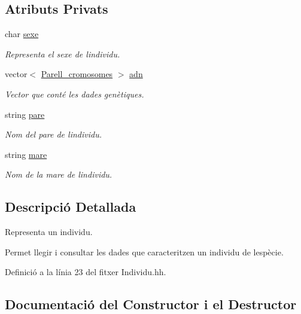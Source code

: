 \subsection*{Atributs Privats}
\begin{DoxyCompactItemize}
\item 
char \hyperlink{class_individu_a978281da58a84f7e4b8f3b9645cc6ec1}{sexe}
\begin{DoxyCompactList}\small\item\em Representa el sexe de l\textquotesingle{}individu. \end{DoxyCompactList}\item 
vector$<$ \hyperlink{class_parell__cromosomes}{Parell\+\_\+cromosomes} $>$ \hyperlink{class_individu_a9e3ff2f5573b349ddb98dff46b11e143}{adn}
\begin{DoxyCompactList}\small\item\em Vector que conté les dades genètiques. \end{DoxyCompactList}\item 
string \hyperlink{class_individu_acd37349b1c7db6e07cd88eade7c622c0}{pare}
\begin{DoxyCompactList}\small\item\em Nom del pare de l\textquotesingle{}individu. \end{DoxyCompactList}\item 
string \hyperlink{class_individu_ae64702bb96cec3867674fb52d6a310e7}{mare}
\begin{DoxyCompactList}\small\item\em Nom de la mare de l\textquotesingle{}individu. \end{DoxyCompactList}\end{DoxyCompactItemize}


\subsection{Descripció Detallada}
Representa un individu. 

Permet llegir i consultar les dades que caracteritzen un individu de l\textquotesingle{}espècie. 

Definició a la línia 23 del fitxer Individu.\+hh.



\subsection{Documentació del Constructor i el Destructor}

